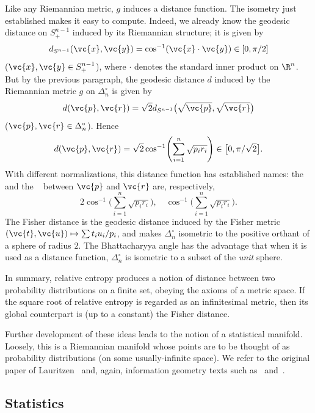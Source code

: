 Like any Riemannian metric, $g$ induces a distance function.  The
isometry just established makes it easy to compute.  Indeed, we already
know the geodesic distance on $S^{n - 1}_+$ induced by its Riemannian
structure; it is given by 
\[
d_{S^{n - 1}}(\vc{x}, \vc{y})
= 
\cos^{-1}(\vc{x} \cdot \vc{y})
\in 
[0, \pi/2]
\]
($\vc{x}, \vc{y} \in S^{n - 1}_+$), where $\cdot$ denotes the standard
inner product on $\R^n$.  But by the previous paragraph, the geodesic
distance $d$ induced by the Riemannian metric $g$ on $\Delta_n^\circ$ is
given by
\[
d(\vc{p}, \vc{r})
=
\sqrt{2} d_{S^{n - 1}}\bigl(\sqrt{\vc{p}}, \sqrt{\vc{r}}\bigr)
\]
($\vc{p}, \vc{r} \in \Delta_n^\circ$).  Hence
\[
d(\vc{p}, \vc{r})
=
\sqrt{2} \cos^{-1} \Biggl( \sum_{i = 1}^n \sqrt{p_i r_i} \Biggr)
\in 
\bigl[0, \pi/\sqrt{2}\bigr].
\]
With different normalizations, this distance function has established
names: the  and the ~\cite{Bhat} between $\vc{p}$ and $\vc{r}$ are, respectively,
\[
2 \cos^{-1} \Biggl( \sum_{i = 1}^n \sqrt{p_i r_i} \Biggr),
\quad
\cos^{-1} \Biggl( \sum_{i = 1}^n \sqrt{p_i r_i} \Biggr).
\]
The Fisher distance is the geodesic distance induced by the
Fisher metric $(\vc{t}, \vc{u}) \mapsto \sum t_i u_i/p_i$, and makes
$\Delta_n^\circ$ isometric to the positive orthant of a sphere of radius
$2$.  The Bhattacharyya angle has the advantage that when it is used as a
distance function, $\Delta_n^\circ$ is isometric to a subset of the
\emph{unit} sphere.

In summary, relative entropy produces a notion of distance between two
probability distributions on a finite set, obeying the axioms of a metric
space.  If the square root of relative entropy is regarded as an
infinitesimal metric, then its global counterpart is (up to a constant) the
Fisher distance.

Further development of these ideas leads to the notion of a
statistical%
%
% 
manifold.  Loosely, this is a Riemannian manifold whose points are to be
thought of as probability distributions (on some usually-infinite space).
We refer to the original paper of Lauritzen~\cite{Laur} and, again,
information geometry texts such as~\cite{AJLS} and~\cite{AmarIGA}.


\subsection*{Statistics}


